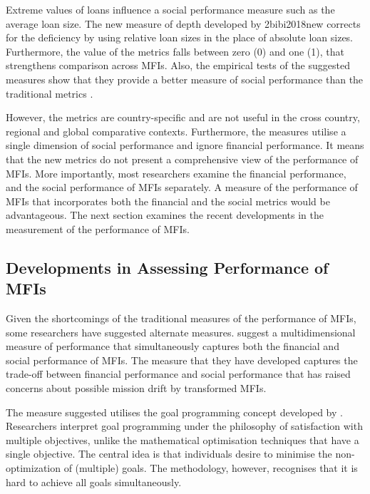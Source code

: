 \documentclass[a4paper,nobind]{templates/ociamthesis}
\begin{document}
Extreme values of loans influence a social performance measure such as the average loan size. The new measure of depth developed by 2bibi2018new corrects for the deficiency by using relative loan sizes in the place of absolute loan sizes. Furthermore, the value of the metrics falls between zero (0) and one (1), that strengthens comparison across MFIs. Also, the empirical tests of the suggested measures show that they provide a better measure of social performance than the traditional metrics \autocite{bibi2018new}.

However, the metrics are country-specific and are not useful in the cross country, regional and global comparative contexts. Furthermore, the measures utilise a single dimension of social performance and ignore financial performance. It means that the new metrics do not present a comprehensive view of the performance of MFIs. More importantly, most researchers examine the financial performance, and the social performance of MFIs separately. A measure of the performance of MFIs that incorporates both the financial and the social metrics would be advantageous. The next section examines the recent developments in the measurement of the performance of MFIs.

\hypertarget{developments-in-assessing-performance-of-mfis}{%
\subsection{Developments in Assessing Performance of MFIs}\label{developments-in-assessing-performance-of-mfis}}

Given the shortcomings of the traditional measures of the performance of MFIs, some researchers have suggested alternate measures. \textcite{cervello2019social} suggest a multidimensional measure of performance that simultaneously captures both the financial and social performance of MFIs. The measure that they have developed captures the trade-off between financial performance and social performance that has raised concerns about possible mission drift by transformed MFIs.

The measure suggested utilises the goal programming concept developed by \autocite{charnes1978measuring}. Researchers interpret goal programming under the philosophy of satisfaction with multiple objectives, unlike the mathematical optimisation techniques that have a single objective. The central idea is that individuals desire to minimise the non-optimization of (multiple) goals. The methodology, however, recognises that it is hard to achieve all goals simultaneously.
\end{document}
